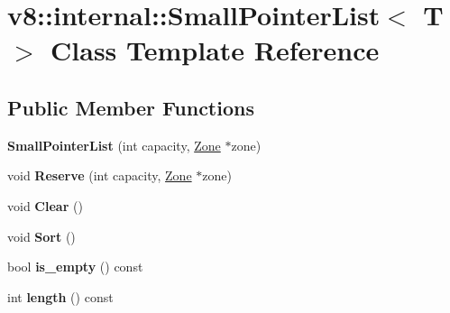 \hypertarget{classv8_1_1internal_1_1_small_pointer_list}{}\section{v8\+:\+:internal\+:\+:Small\+Pointer\+List$<$ T $>$ Class Template Reference}
\label{classv8_1_1internal_1_1_small_pointer_list}
\subsection*{Public Member Functions}
\begin{DoxyCompactItemize}
\item 
{\bfseries Small\+Pointer\+List} (int capacity, \hyperlink{classv8_1_1internal_1_1_zone}{Zone} $\ast$zone)\hypertarget{classv8_1_1internal_1_1_small_pointer_list_a2016d502c30d5e0d1ef3e16aed421553}{}\label{classv8_1_1internal_1_1_small_pointer_list_a2016d502c30d5e0d1ef3e16aed421553}

\item 
void {\bfseries Reserve} (int capacity, \hyperlink{classv8_1_1internal_1_1_zone}{Zone} $\ast$zone)\hypertarget{classv8_1_1internal_1_1_small_pointer_list_a340f38f2f4e23d775f0ab9f77ae0f316}{}\label{classv8_1_1internal_1_1_small_pointer_list_a340f38f2f4e23d775f0ab9f77ae0f316}

\item 
void {\bfseries Clear} ()\hypertarget{classv8_1_1internal_1_1_small_pointer_list_ae880d721f281d63120ae6f6190617030}{}\label{classv8_1_1internal_1_1_small_pointer_list_ae880d721f281d63120ae6f6190617030}

\item 
void {\bfseries Sort} ()\hypertarget{classv8_1_1internal_1_1_small_pointer_list_a9ffb1bc5a807fc012a6d006689dd6d70}{}\label{classv8_1_1internal_1_1_small_pointer_list_a9ffb1bc5a807fc012a6d006689dd6d70}

\item 
bool {\bfseries is\+\_\+empty} () const \hypertarget{classv8_1_1internal_1_1_small_pointer_list_af526d8806666c0dce9101cf82cb34ff3}{}\label{classv8_1_1internal_1_1_small_pointer_list_af526d8806666c0dce9101cf82cb34ff3}

\item 
int {\bfseries length} () const \hypertarget{classv8_1_1internal_1_1_small_pointer_list_a789f7870d6814b33dc60cee5e5e3b02a}{}\label{classv8_1_1internal_1_1_small_pointer_list_a789f7870d6814b33dc60cee5e5e3b02a}


\end{DoxyCompactItemize}

